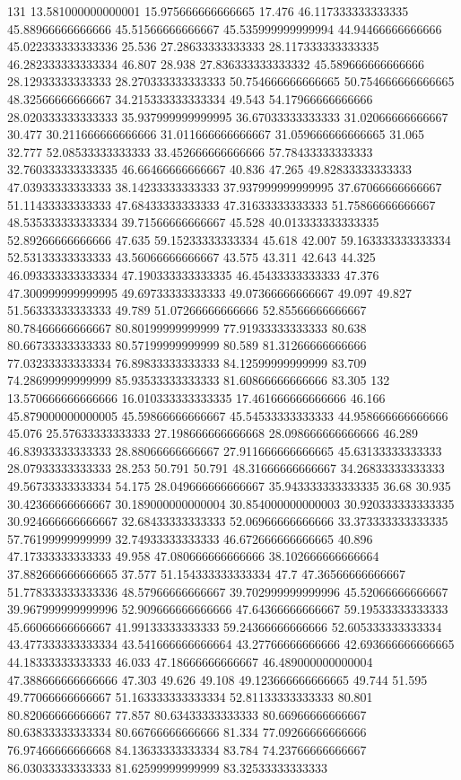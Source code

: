131 13.581000000000001 15.975666666666665 17.476 46.117333333333335 45.88966666666666 45.51566666666667 45.535999999999994 44.94466666666666 45.022333333333336 25.536 27.28633333333333 28.117333333333335 46.282333333333334 46.807 28.938 27.836333333333332 45.589666666666666 28.12933333333333 28.270333333333333 50.754666666666665 50.754666666666665 48.32566666666667 34.215333333333334 49.543 54.17966666666666 28.020333333333333 35.937999999999995 36.67033333333333 31.02066666666667 30.477 30.211666666666666 31.011666666666667 31.059666666666665 31.065 32.777 52.08533333333333 33.452666666666666 57.78433333333333 32.760333333333335 46.66466666666667 40.836 47.265 49.82833333333333 47.03933333333333 38.14233333333333 37.937999999999995 37.67066666666667 51.11433333333333 47.68433333333333 47.31633333333333 51.75866666666667 48.535333333333334 39.71566666666667 45.528 40.013333333333335 52.89266666666666 47.635 59.15233333333334 45.618 42.007 59.163333333333334 52.53133333333333 43.56066666666667 43.575 43.311 42.643 44.325 46.093333333333334 47.190333333333335 46.45433333333333 47.376 47.300999999999995 49.69733333333333 49.07366666666667 49.097 49.827 51.56333333333333 49.789 51.07266666666666 52.85566666666667 80.78466666666667 80.80199999999999 77.91933333333333 80.638 80.66733333333333 80.57199999999999 80.589 81.31266666666666 77.03233333333334 76.89833333333333 84.12599999999999 83.709 74.28699999999999 85.93533333333333 81.60866666666666 83.305
132 13.570666666666666 16.010333333333335 17.461666666666666 46.166 45.879000000000005 45.59866666666667 45.54533333333333 44.958666666666666 45.076 25.57633333333333 27.198666666666668 28.098666666666666 46.289 46.83933333333333 28.88066666666667 27.911666666666665 45.63133333333333 28.07933333333333 28.253 50.791 50.791 48.31666666666667 34.26833333333333 49.56733333333334 54.175 28.049666666666667 35.943333333333335 36.68 30.935 30.42366666666667 30.189000000000004 30.854000000000003 30.920333333333335 30.924666666666667 32.68433333333333 52.06966666666666 33.373333333333335 57.76199999999999 32.74933333333333 46.672666666666665 40.896 47.17333333333333 49.958 47.080666666666666 38.102666666666664 37.882666666666665 37.577 51.154333333333334 47.7 47.36566666666667 51.778333333333336 48.57966666666667 39.702999999999996 45.52066666666667 39.967999999999996 52.909666666666666 47.64366666666667 59.19533333333333 45.66066666666667 41.99133333333333 59.24366666666666 52.605333333333334 43.477333333333334 43.541666666666664 43.27766666666666 42.693666666666665 44.18333333333333 46.033 47.18666666666667 46.489000000000004 47.388666666666666 47.303 49.626 49.108 49.123666666666665 49.744 51.595 49.77066666666667 51.163333333333334 52.81133333333333 80.801 80.82066666666667 77.857 80.63433333333333 80.66966666666667 80.63833333333334 80.66766666666666 81.334 77.09266666666666 76.97466666666668 84.13633333333334 83.784 74.23766666666667 86.03033333333333 81.62599999999999 83.32533333333333
